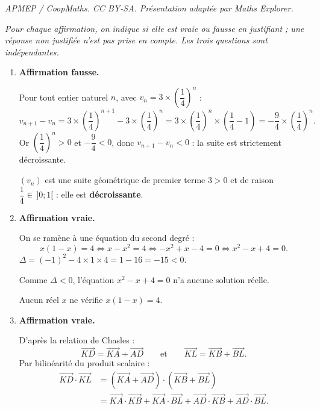 \documentclass[10pt]{article}
\begin{document}
\noindent\textit{APMEP / CoopMaths. CC BY-SA. Présentation adaptée par Maths Explorer.}\par\medskip
\emph{Pour chaque affirmation, on indique si elle est vraie ou fausse en justifiant ; une
réponse non justifiée n'est pas prise en compte. Les trois questions sont indépendantes.}

\begin{enumerate}
	\item \textbf{Affirmation fausse.}

	Pour tout entier naturel $n$, avec $v_n = 3 \times \left(\dfrac{1}{4}\right)^n$ :
	\[v_{n+1} - v_n = 3 \times \left(\dfrac{1}{4}\right)^{n+1} - 3 \times \left(\dfrac{1}{4}\right)^n
	= 3 \times \left(\dfrac{1}{4}\right)^n \times \left(\dfrac{1}{4} - 1\right)
	= -\dfrac{9}{4} \times \left(\dfrac{1}{4}\right)^n.\]
	Or $\left(\dfrac{1}{4}\right)^n > 0$ et $-\dfrac{9}{4} < 0$, donc $v_{n+1} - v_n < 0$ : la suite est strictement
	décroissante. 

	$(v_n)$ est une suite géométrique de premier terme $3 > 0$ et de
	raison $\dfrac{1}{4} \in \,]0 ; 1[$ : elle est \textbf{décroissante}.

	\item \textbf{Affirmation vraie.}

	On se ramène à une équation du second degré :
	\[x(1-x) = 4 \iff x - x^2 = 4 \iff -x^2 + x - 4 = 0 \iff x^2 - x + 4 = 0.\]
	$\Delta = (-1)^2 - 4 \times 1 \times 4 = 1 - 16 = -15 < 0$.

	Comme $\Delta < 0$, l'équation $x^2 - x + 4 = 0$ n'a aucune
	solution réelle. 
	
	Aucun réel $x$ ne vérifie $x(1-x) = 4$.

	\item \textbf{Affirmation vraie.}

	
D'après la relation de Chasles :
\[
\overrightarrow{KD}=\overrightarrow{KA}+\overrightarrow{AD}
\qquad\text{et}\qquad
\overrightarrow{KL}=\overrightarrow{KB}+\overrightarrow{BL}.
\]
Par bilinéarité du produit scalaire :
\begin{align*}
\overrightarrow{KD}\cdot\overrightarrow{KL}
&=\left(\overrightarrow{KA}+\overrightarrow{AD}\right)\cdot\left(\overrightarrow{KB}+\overrightarrow{BL}\right)\\
&=\overrightarrow{KA}\cdot\overrightarrow{KB}
+\overrightarrow{KA}\cdot\overrightarrow{BL}
+\overrightarrow{AD}\cdot\overrightarrow{KB}
+\overrightarrow{AD}\cdot\overrightarrow{BL}.
\end{align*}



\end{enumerate}
\end{document}
